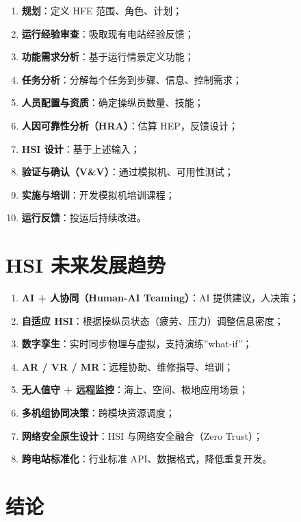 \documentclass[
  UTF8,
  scheme=plain,
  fontsize=10pt,
  openany
]{ctexbook}
\begin{document}
\begin{enumerate}
\def\labelenumi{\arabic{enumi}.}
\tightlist
\item
  \textbf{规划}：定义 HFE 范围、角色、计划；
\item
  \textbf{运行经验审查}：吸取现有电站经验反馈；
\item
  \textbf{功能需求分析}：基于运行情景定义功能；
\item
  \textbf{任务分析}：分解每个任务到步骤、信息、控制需求；
\item
  \textbf{人员配置与资质}：确定操纵员数量、技能；
\item
  \textbf{人因可靠性分析（HRA）}：估算 HEP，反馈设计；
\item
  \textbf{HSI 设计}：基于上述输入；
\item
  \textbf{验证与确认（V\&V）}：通过模拟机、可用性测试；
\item
  \textbf{实施与培训}：开发模拟机培训课程；
\item
  \textbf{运行反馈}：投运后持续改进。
\end{enumerate}

\section{HSI
未来发展趋势}\label{hsi-ux672aux6765ux53d1ux5c55ux8d8bux52bf}

\begin{enumerate}
\def\labelenumi{\arabic{enumi}.}
\tightlist
\item
  \textbf{AI + 人协同（Human-AI Teaming）}：AI 提供建议，人决策；
\item
  \textbf{自适应 HSI}：根据操纵员状态（疲劳、压力）调整信息密度；
\item
  \textbf{数字孪生}：实时同步物理与虚拟，支持演练''what-if''；
\item
  \textbf{AR / VR / MR}：远程协助、维修指导、培训；
\item
  \textbf{无人值守 + 远程监控}：海上、空间、极地应用场景；
\item
  \textbf{多机组协同决策}：跨模块资源调度；
\item
  \textbf{网络安全原生设计}：HSI 与网络安全融合（Zero Trust）；
\item
  \textbf{跨电站标准化}：行业标准 API、数据格式，降低重复开发。
\end{enumerate}

\section{结论}\label{ux7ed3ux8bba-4}
\end{document}
